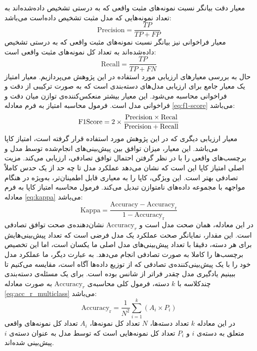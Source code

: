 معیار دقت بیانگر نسبت نمونه‌های مثبت واقعی که به درستی تشخیص داده‌شده‌اند به تعداد نمونه‌هایی که مدل مثبت تشخیص داده‌است می‌باشد:
\begin{equation}
    \mathrm{Precision}=\frac{TP}{TP+FP}
\end{equation}
معیار فراخوانی نیز بیانگر نسبت نمونه‌های مثبت واقعی که به درستی تشخیص داده‌شده‌اند به تعداد کل نمونه‌های مثبت واقعی است:
\begin{equation}
    \mathrm{Recall}=\frac{TP}{TP+FN}
\end{equation}
حال به بررسی معیارهای ارزیابی مورد استفاده در این پژوهش می‌پردازیم. معیار امتیاز 
یک معیار جامع برای ارزیابی مدل‌های دسته‌بندی است که به صورت ترکیبی از دقت و فراخوانی محاسبه می‌شود. این معیار بیشتر منعکس‌کننده‌ی توازن میان دقت و فراخوانی مدل است. فرمول محاسبه امتیاز  به فرم معادله \ref{eq:f1-score} می‌باشد:
\begin{equation}
    \mathrm{F1 \space Score}=2\times\frac{\mathrm{Precision}\times\mathrm{Recal}}{\mathrm{Precision}+\mathrm{Recall}}
    \label{eq:f1-score}
\end{equation}
معیار ارزیابی دیگری که در این پژوهش مورد استفاده قرار گرفته است، امتیاز کاپا می‌باشد. این معیار، میزان توافق بین پیش‌بینی‌های انجام‌شده توسط مدل و برچسب‌های واقعی را با در نظر گرفتن احتمال توافق تصادفی، ارزیابی می‌کند. مزیت اصلی امتیاز کاپا این است که نشان می‌دهد عملکرد مدل تا چه حد از یک حدس کاملاً تصادفی بهتر است. این ویژگی، کاپا را به معیاری قابل اطمینان‌تر، به‌ویژه در هنگام مواجهه با مجموعه داده‌های نامتوازن تبدیل می‌کند. فرمول محاسبه امتیاز کاپا به فرم معادله \ref{eq:kappa} می‌باشد:
\begin{equation}
\mathrm{Kappa} = \frac{\mathrm{Accuracy} - \mathrm{Accuracy_r}}{1 - \mathrm{Accuracy_r}}
\label{eq:kappa}
\end{equation}
در این معادله،
همان صحت مدل است و $\mathrm{Accuracy}_r$
نشان‌دهنده‌ی صحت توافق تصادفی است. این مقدار، نمایانگر صحت عملکرد یک مدل فرضی است که تعداد پیش‌بینی‌هایش برای هر دسته، دقیقا با تعداد پیش‌بینی‌های مدل اصلی ما یکسان است، اما این تخصیص برچسب‌ها را کاملا 
به صورت تصادفی انجام می‌دهد. به عبارت دیگر، ما عملکرد مدل خود را با یک پیش‌بینی‌کننده‌ی تصادفی که از توزیع داده‌ها آگاه است، مقایسه می‌کنیم تا ببینیم یادگیری مدل چقدر فراتر از شانس بوده است. برای یک مسئله‌ی دسته‌بندی چندکلاسه با $k$
دسته، فرمول کلی محاسبه‌ی $\mathrm{Accuracy}_r$
به صورت معادله \ref{eq:acc_r_multiclass} می‌باشد:
\begin{equation}
\mathrm{Accuracy_r} = \frac{1}{N^2} \sum_{i=1}^{k} (A_i \times P_i)
\label{eq:acc_r_multiclass}
\end{equation}
در این معادله $k$ تعداد دسته‌ها، $N$ تعداد کل نمونه‌ها، $A_i$ تعداد کل نمونه‌های واقعی متعلق به دسته‌ی $i$ و $P_i$
تعداد کل نمونه‌هایی است که توسط مدل به عنوان دسته‌ی $i$ پیش‌بینی شده‌اند.

